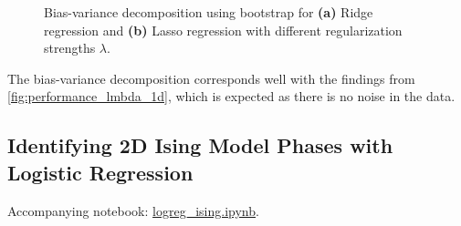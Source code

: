 \begin{figure}[H]
\centering
{}
\qquad
{}
\caption{Bias-variance decomposition using bootstrap for \textbf{(a)} Ridge regression and \textbf{(b)} Lasso regression with different regularization strengths $\lambda$.}
\label{fig:bias_var__1d}
\end{figure}

The bias-variance decomposition corresponds well with the findings from \autoref{fig:performance_lmbda_1d}, which is expected as there is no noise in the data.

\subsection{Identifying 2D Ising Model Phases with Logistic Regression}\label{sec:results logreg}
Accompanying notebook: \href{https://github.com/nicolossus/FYS-STK4155-Project2/blob/master/notebooks/logreg_ising.ipynb}{logreg\_ising.ipynb}. 

